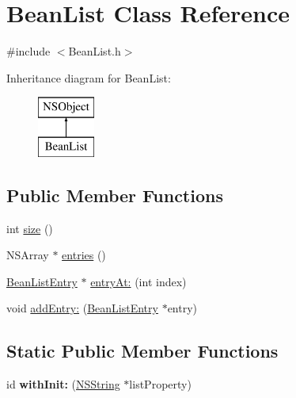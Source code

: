 \hypertarget{interface_bean_list}{
\section{\-Bean\-List \-Class \-Reference}
\label{interface_bean_list}
}


{\ttfamily \#include $<$\-Bean\-List.\-h$>$}

\-Inheritance diagram for \-Bean\-List\-:\begin{figure}[H]
\begin{center}
\leavevmode
\includegraphics[height=2.000000cm]{interface_bean_list}
\end{center}
\end{figure}
\subsection*{\-Public \-Member \-Functions}
\begin{DoxyCompactItemize}
\item 
int \hyperlink{interface_bean_list_a677c0c7e98b7166d23b2224e4ec854c5}{size} ()
\item 
\-N\-S\-Array $\ast$ \hyperlink{interface_bean_list_af1c53b82ba2cb9562ea7630e471ceaf0}{entries} ()
\item 
\hyperlink{interface_bean_list_entry}{\-Bean\-List\-Entry} $\ast$ \hyperlink{interface_bean_list_a16895457753978b69dd1a178db89a867}{entry\-At\-:} (int index)
\item 
void \hyperlink{interface_bean_list_af21170dda8374eaf8b5d030ab60718fb}{add\-Entry\-:} (\hyperlink{interface_bean_list_entry}{\-Bean\-List\-Entry} $\ast$entry)
\end{DoxyCompactItemize}
\subsection*{\-Static \-Public \-Member \-Functions}
\begin{DoxyCompactItemize}
\item 
\hypertarget{interface_bean_list_ad3666667cd955df19593abe683db3001}{
id {\bfseries with\-Init\-:} (\hyperlink{class_n_s_string}{\-N\-S\-String} $\ast$list\-Property)}
\label{interface_bean_list_ad3666667cd955df19593abe683db3001}

\end{DoxyCompactItemize}

